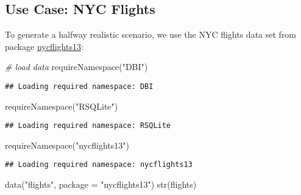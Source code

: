 \documentclass[
]{scrbook}
\newenvironment{Shaded}{\begin{snugshade}}{\end{snugshade}}
\newcommand{\AttributeTok}[1]{\textcolor[rgb]{0.77,0.63,0.00}{#1}}
\newcommand{\CommentTok}[1]{\textcolor[rgb]{0.56,0.35,0.01}{\textit{#1}}}
\newcommand{\FunctionTok}[1]{\textcolor[rgb]{0.00,0.00,0.00}{#1}}
\newcommand{\NormalTok}[1]{#1}
\newcommand{\StringTok}[1]{\textcolor[rgb]{0.31,0.60,0.02}{#1}}
\renewenvironment{Shaded} {\begin{snugshade}\small} {\end{snugshade}}
\begin{document}
\hypertarget{use-case-nyc-flights}{%
\subsection{Use Case: NYC Flights}\label{use-case-nyc-flights}}

To generate a halfway realistic scenario, we use the NYC flights data set from package \href{https://cran.r-project.org/package=nycflights13}{nycflights13}:

\begin{Shaded}
\begin{Highlighting}[]
\CommentTok{\# load data}
\FunctionTok{requireNamespace}\NormalTok{(}\StringTok{"DBI"}\NormalTok{)}
\end{Highlighting}
\end{Shaded}

\begin{verbatim}
## Loading required namespace: DBI
\end{verbatim}

\begin{Shaded}
\begin{Highlighting}[]
\FunctionTok{requireNamespace}\NormalTok{(}\StringTok{"RSQLite"}\NormalTok{)}
\end{Highlighting}
\end{Shaded}

\begin{verbatim}
## Loading required namespace: RSQLite
\end{verbatim}

\begin{Shaded}
\begin{Highlighting}[]
\FunctionTok{requireNamespace}\NormalTok{(}\StringTok{"nycflights13"}\NormalTok{)}
\end{Highlighting}
\end{Shaded}

\begin{verbatim}
## Loading required namespace: nycflights13
\end{verbatim}

\begin{Shaded}
\begin{Highlighting}[]
\FunctionTok{data}\NormalTok{(}\StringTok{"flights"}\NormalTok{, }\AttributeTok{package =} \StringTok{"nycflights13"}\NormalTok{)}
\FunctionTok{str}\NormalTok{(flights)}
\end{Highlighting}
\end{Shaded}
\end{document}
